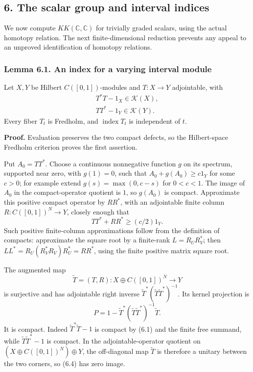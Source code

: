 \documentclass[
  11pt,
]{article}
\begin{document}
\subsection{6. The scalar group and interval
indices}\label{the-scalar-group-and-interval-indices}

We now compute \(KK(\mathbb C,\mathbb C)\) for trivially graded scalars,
using the actual homotopy relation. The next finite-dimensional
reduction prevents any appeal to an unproved identification of homotopy
relations.

\subsubsection{Lemma 6.1. An index for a varying interval
module}\label{lemma-6.1.-an-index-for-a-varying-interval-module}

Let \(X,Y\) be Hilbert \(C([0,1])\)-modules and \(T:X\to Y\)
adjointable, with \[
\begin{gathered}
T^*T-1_X\in\mathcal K(X),\\
TT^*-1_Y\in\mathcal K(Y).
\end{gathered}
\tag{6.1}
\] Every fiber \(T_t\) is Fredholm, and \(\operatorname{index}T_t\) is
independent of \(t\).

\textbf{Proof.} Evaluation preserves the two compact defects, so the
Hilbert-space Fredholm criterion proves the first assertion.

Put \(A_0=TT^*\). Choose a continuous nonnegative function \(g\) on its
spectrum, supported near zero, with \(g(1)=0\), such that
\(A_0+g(A_0)\geq c1_Y\) for some \(c>0\); for example extend
\(g(s)=\max(0,c-s)\) for \(0<c<1\). The image of \(A_0\) in the
compact-operator quotient is \(1\), so \(g(A_0)\) is compact.
Approximate this positive compact operator by \(RR^*\), with an
adjointable finite column \(R:C([0,1])^N\to Y\), closely enough that \[
TT^*+RR^*\geq(c/2)1_Y.
\tag{6.2}
\] Such positive finite-column approximations follow from the definition
of compacts: approximate the square root by a finite-rank
\(L=R_UR_V^*\); then \(LL^*=R_U(R_V^*R_V)R_U^*=RR^*\), using the finite
positive matrix square root.

The augmented map \[
\widetilde T=(T,R):X\oplus C([0,1])^N\to Y
\tag{6.3}
\] is surjective and has adjointable right inverse
\(\widetilde T^*(\widetilde T\widetilde T^*)^{-1}\). Its kernel
projection is \[
P=1-\widetilde T^*
(\widetilde T\widetilde T^*)^{-1}\widetilde T.
\tag{6.4}
\] It is compact. Indeed \(\widetilde T^*\widetilde T-1\) is compact by
(6.1) and the finite free summand, while
\(\widetilde T\widetilde T^*-1\) is compact. In the adjointable-operator
quotient on \((X\oplus C([0,1])^N)\oplus Y\), the off-diagonal map
\(\widetilde T\) is therefore a unitary between the two corners, so
(6.4) has zero image.
\end{document}

